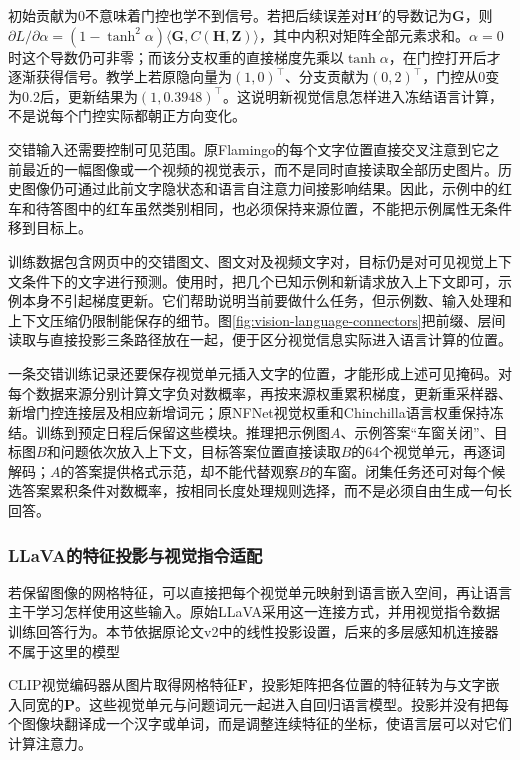 初始贡献为0不意味着门控也学不到信号。若把后续误差对$\bm H'$的导数记为$\bm G$，则$\partial L/\partial\alpha=(1-\tanh^2\alpha)\langle\bm G,C(\bm H,\bm Z)\rangle$，其中内积对矩阵全部元素求和。$\alpha=0$时这个导数仍可非零；而该分支权重的直接梯度先乘以$\tanh\alpha$，在门控打开后才逐渐获得信号。教学上若原隐向量为$(1,0)^\top$、分支贡献为$(0,2)^\top$，门控从0变为0.2后，更新结果为$(1,0.3948)^\top$。这说明新视觉信息怎样进入冻结语言计算，不是说每个门控实际都朝正方向变化。

交错输入还需要控制可见范围。原Flamingo的每个文字位置直接交叉注意到它之前最近的一幅图像或一个视频的视觉表示，而不是同时直接读取全部历史图片。历史图像仍可通过此前文字隐状态和语言自注意力间接影响结果。因此，示例中的红车和待答图中的红车虽然类别相同，也必须保持来源位置，不能把示例属性无条件移到目标上。

训练数据包含网页中的交错图文、图文对及视频文字对，目标仍是对可见视觉上下文条件下的文字进行预测。使用时，把几个已知示例和新请求放入上下文即可，示例本身不引起梯度更新。它们帮助说明当前要做什么任务，但示例数、输入处理和上下文压缩仍限制能保存的细节。图\ref{fig:vision-language-connectors}把前缀、层间读取与直接投影三条路径放在一起，便于区分视觉信息实际进入语言计算的位置。

一条交错训练记录还要保存视觉单元插入文字的位置，才能形成上述可见掩码。对每个数据来源分别计算文字负对数概率，再按来源权重累积梯度，更新重采样器、新增门控连接层及相应新增词元；原NFNet视觉权重和Chinchilla语言权重保持冻结。训练到预定日程后保留这些模块。推理把示例图$A$、示例答案“车窗关闭”、目标图$B$和问题依次放入上下文，目标答案位置直接读取$B$的64个视觉单元，再逐词解码；$A$的答案提供格式示范，却不能代替观察$B$的车窗。闭集任务还可对每个候选答案累积条件对数概率，按相同长度处理规则选择，而不是必须自由生成一句长回答。

\subsubsection{LLaVA的特征投影与视觉指令适配}
\label{sec:vision-models-llava}

若保留图像的网格特征，可以直接把每个视觉单元映射到语言嵌入空间，再让语言主干学习怎样使用这些输入。原始LLaVA采用这一连接方式，并用视觉指令数据训练回答行为。本节依据原论文v2中的线性投影设置，后来的多层感知机连接器不属于这里的模型

CLIP视觉编码器从图片取得网格特征$\bm F$，投影矩阵把各位置的特征转为与文字嵌入同宽的$\bm P$。这些视觉单元与问题词元一起进入自回归语言模型。投影并没有把每个图像块翻译成一个汉字或单词，而是调整连续特征的坐标，使语言层可以对它们计算注意力。

